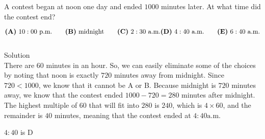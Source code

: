 

A contest began at noon one day and ended $ 1000$ minutes later. At what time did the contest end?

\[ \textbf{(A)}\ 10: 00 \text{ p.m.} \qquad
\textbf{(B)}\ \text{midnight} \qquad
\textbf{(C)}\ 2: 30 \text{ a.m.} \\
\textbf{(D)}\ 4: 40 \text{ a.m.} \qquad
\textbf{(E)}\ 6: 40 \text{ a.m.}
\]
\\
Solution
\\
There are $60$ minutes in an hour. So, we can easily eliminate some of the choices by noting that noon is exactly $720$ minutes away from midnight. Since $720 < 1000$, we know that it cannot be A or B. Because midnight is $720$ minutes away, we know that the contest ended $1000 - 720 = 280$ minutes after midnight. The highest multiple of 60 that will fit into $280$ is $240$, which is $4 \times 60$, and the remainder is $40$ minutes, meaning that the contest ended at $4:40 \text{a.m.}$

$4:40$ is $\boxed{\text{D}}$
